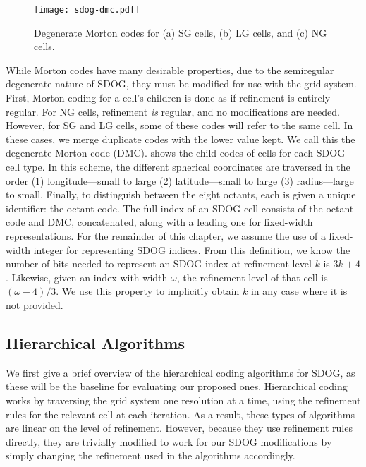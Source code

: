 \begin{figure}[ht!]
	\centering
	\texttt{[image: sdog-dmc.pdf]}
	\caption[Degenerate Morton codes for the different SDOG cell types]{
		Degenerate Morton codes for (a) SG cells, (b) LG cells, and (c) NG cells.
	}
	\label{fig:sdog-dmc}
\end{figure}


While Morton codes have many desirable properties, due to the semiregular degenerate nature of SDOG, they must be modified for use with the grid system.
First, Morton coding for a cell's children is done as if refinement is entirely regular.
For NG cells, refinement \textit{is} regular, and no modifications are needed.
However, for SG and LG cells, some of these codes will refer to the same cell.
In these cases, we merge duplicate codes with the lower value kept.
We call this the degenerate Morton code (DMC).
 shows the child codes of cells for each SDOG cell type.
In this scheme, the different spherical coordinates are traversed in the order (1) longitude---small to large (2) latitude---small to large (3) radius---large to small.
Finally, to distinguish between the eight octants, each is given a unique identifier: the octant code.
The full index of an SDOG cell consists of the octant code and DMC, concatenated, along with a leading one for fixed-width representations.
For the remainder of this chapter, we assume the use of a fixed-width integer for representing SDOG indices.
From this definition, we know the number of bits needed to represent an SDOG index at refinement level $k$ is $3k + 4$.
Likewise, given an index with width $\omega$, the refinement level of that cell is $(\omega - 4) / 3$.
We use this property to implicitly obtain $k$ in any case where it is not provided.


\subsection{Hierarchical Algorithms}
We first give a brief overview of the hierarchical coding algorithms for SDOG, as these will be the baseline for evaluating our proposed ones.
Hierarchical coding works by traversing the grid system one resolution at a time, using the refinement rules for the relevant cell at each iteration.
As a result, these types of algorithms are linear on the level of refinement.
However, because they use refinement rules directly, they are trivially modified to work for our SDOG modifications by simply changing the refinement used in the algorithms accordingly.



